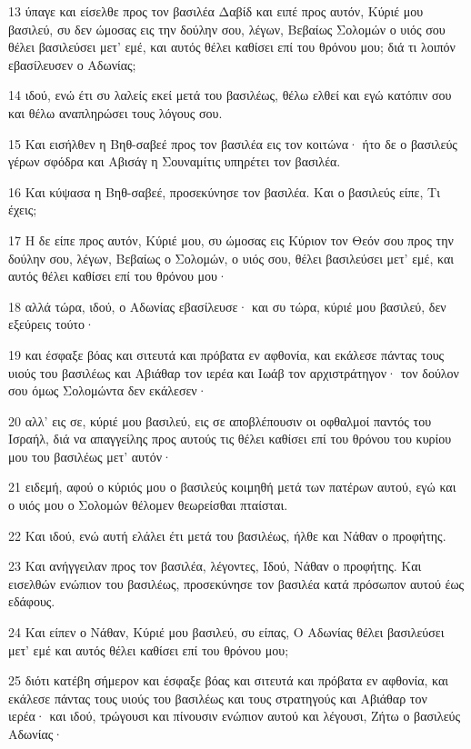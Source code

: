 \par 13 ύπαγε και είσελθε προς τον βασιλέα Δαβίδ και ειπέ προς αυτόν, Κύριέ μου βασιλεύ, συ δεν ώμοσας εις την δούλην σου, λέγων, Βεβαίως Σολομών ο υιός σου θέλει βασιλεύσει μετ' εμέ, και αυτός θέλει καθίσει επί του θρόνου μου; διά τι λοιπόν εβασίλευσεν ο Αδωνίας;
\par 14 ιδού, ενώ έτι συ λαλείς εκεί μετά του βασιλέως, θέλω ελθεί και εγώ κατόπιν σου και θέλω αναπληρώσει τους λόγους σου.
\par 15 Και εισήλθεν η Βηθ-σαβεέ προς τον βασιλέα εις τον κοιτώνα· ήτο δε ο βασιλεύς γέρων σφόδρα και Αβισάγ η Σουναμίτις υπηρέτει τον βασιλέα.
\par 16 Και κύψασα η Βηθ-σαβεέ, προσεκύνησε τον βασιλέα. Και ο βασιλεύς είπε, Τι έχεις;
\par 17 Η δε είπε προς αυτόν, Κύριέ μου, συ ώμοσας εις Κύριον τον Θεόν σου προς την δούλην σου, λέγων, Βεβαίως ο Σολομών, ο υιός σου, θέλει βασιλεύσει μετ' εμέ, και αυτός θέλει καθίσει επί του θρόνου μου·
\par 18 αλλά τώρα, ιδού, ο Αδωνίας εβασίλευσε· και συ τώρα, κύριέ μου βασιλεύ, δεν εξεύρεις τούτο·
\par 19 και έσφαξε βόας και σιτευτά και πρόβατα εν αφθονία, και εκάλεσε πάντας τους υιούς του βασιλέως και Αβιάθαρ τον ιερέα και Ιωάβ τον αρχιστράτηγον· τον δούλον σου όμως Σολομώντα δεν εκάλεσεν·
\par 20 αλλ' εις σε, κύριέ μου βασιλεύ, εις σε αποβλέπουσιν οι οφθαλμοί παντός του Ισραήλ, διά να απαγγείλης προς αυτούς τις θέλει καθίσει επί του θρόνου του κυρίου μου του βασιλέως μετ' αυτόν·
\par 21 ειδεμή, αφού ο κύριός μου ο βασιλεύς κοιμηθή μετά των πατέρων αυτού, εγώ και ο υιός μου ο Σολομών θέλομεν θεωρείσθαι πταίσται.
\par 22 Και ιδού, ενώ αυτή ελάλει έτι μετά του βασιλέως, ήλθε και Νάθαν ο προφήτης.
\par 23 Και ανήγγειλαν προς τον βασιλέα, λέγοντες, Ιδού, Νάθαν ο προφήτης. Και εισελθών ενώπιον του βασιλέως, προσεκύνησε τον βασιλέα κατά πρόσωπον αυτού έως εδάφους.
\par 24 Και είπεν ο Νάθαν, Κύριέ μου βασιλεύ, συ είπας, Ο Αδωνίας θέλει βασιλεύσει μετ' εμέ και αυτός θέλει καθίσει επί του θρόνου μου;
\par 25 διότι κατέβη σήμερον και έσφαξε βόας και σιτευτά και πρόβατα εν αφθονία, και εκάλεσε πάντας τους υιούς του βασιλέως και τους στρατηγούς και Αβιάθαρ τον ιερέα· και ιδού, τρώγουσι και πίνουσιν ενώπιον αυτού και λέγουσι, Ζήτω ο βασιλεύς Αδωνίας·
